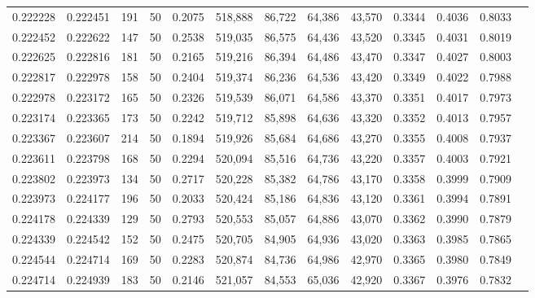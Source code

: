 \begin{tabular}{rrrrrrrrrrrrr}
0.222228 & 0.222451 &   191 &  50 &                                     0.2075 & 518,888 &  86,722 &  64,386 &  43,570 & 0.3344 & 0.4036 & 0.8033 \\
0.222452 & 0.222622 &   147 &  50 &                                     0.2538 & 519,035 &  86,575 &  64,436 &  43,520 & 0.3345 & 0.4031 & 0.8019 \\
0.222625 & 0.222816 &   181 &  50 &                                     0.2165 & 519,216 &  86,394 &  64,486 &  43,470 & 0.3347 & 0.4027 & 0.8003 \\
0.222817 & 0.222978 &   158 &  50 &                                     0.2404 & 519,374 &  86,236 &  64,536 &  43,420 & 0.3349 & 0.4022 & 0.7988 \\
0.222978 & 0.223172 &   165 &  50 &                                     0.2326 & 519,539 &  86,071 &  64,586 &  43,370 & 0.3351 & 0.4017 & 0.7973 \\
0.223174 & 0.223365 &   173 &  50 &                                     0.2242 & 519,712 &  85,898 &  64,636 &  43,320 & 0.3352 & 0.4013 & 0.7957 \\
0.223367 & 0.223607 &   214 &  50 &                                     0.1894 & 519,926 &  85,684 &  64,686 &  43,270 & 0.3355 & 0.4008 & 0.7937 \\
0.223611 & 0.223798 &   168 &  50 &                                     0.2294 & 520,094 &  85,516 &  64,736 &  43,220 & 0.3357 & 0.4003 & 0.7921 \\
0.223802 & 0.223973 &   134 &  50 &                                     0.2717 & 520,228 &  85,382 &  64,786 &  43,170 & 0.3358 & 0.3999 & 0.7909 \\
0.223973 & 0.224177 &   196 &  50 &                                     0.2033 & 520,424 &  85,186 &  64,836 &  43,120 & 0.3361 & 0.3994 & 0.7891 \\
0.224178 & 0.224339 &   129 &  50 &                                     0.2793 & 520,553 &  85,057 &  64,886 &  43,070 & 0.3362 & 0.3990 & 0.7879 \\
0.224339 & 0.224542 &   152 &  50 &                                     0.2475 & 520,705 &  84,905 &  64,936 &  43,020 & 0.3363 & 0.3985 & 0.7865 \\
0.224544 & 0.224714 &   169 &  50 &                                     0.2283 & 520,874 &  84,736 &  64,986 &  42,970 & 0.3365 & 0.3980 & 0.7849 \\
0.224714 & 0.224939 &   183 &  50 &                                     0.2146 & 521,057 &  84,553 &  65,036 &  42,920 & 0.3367 & 0.3976 & 0.7832 \\

\end{tabular}
